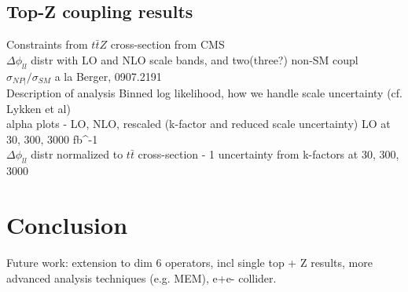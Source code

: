 \documentclass[preprint]{JHEP3} %
\newcommand{\Dphill}{\Delta \phi_{ll}}
\begin{document}
\subsection{Top-Z coupling results}
Constraints from $t\bar{t}Z$ cross-section from CMS \\
$\Dphill$ distr with LO and NLO scale bands, and two(three?) non-SM coupl\\
$\sigma_{NP|} / \sigma_{SM}$ a la Berger, 0907.2191 \\
Description of analysis Binned log likelihood, how we handle scale uncertainty (cf. Lykken et al) \\
alpha plots - LO, NLO, rescaled (k-factor and reduced scale uncertainty) LO at 30, 300, 3000 fb^-1\\
$\Dphill$ distr normalized to $t\bar{t}$ cross-section  - 1 uncertainty from k-factors at 30, 300, 3000\\

\section{Conclusion}
Future work: extension to dim 6 operators, incl single top + Z results, more advanced analysis techniques (e.g. MEM), e+e- collider.
\end{document}
